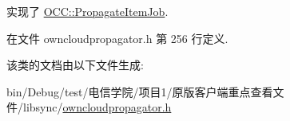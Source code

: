 实现了 \hyperlink{class_o_c_c_1_1_propagate_item_job_a97e7a37e51ad1696f6590dd52080f10a}{O\+C\+C\+::\+Propagate\+Item\+Job}.



在文件 owncloudpropagator.\+h 第 256 行定义.



该类的文档由以下文件生成\+:\begin{DoxyCompactItemize}
\item 
bin/\+Debug/test/电信学院/项目1/原版客户端重点查看文件/libsync/\hyperlink{owncloudpropagator_8h}{owncloudpropagator.\+h}\end{DoxyCompactItemize}
